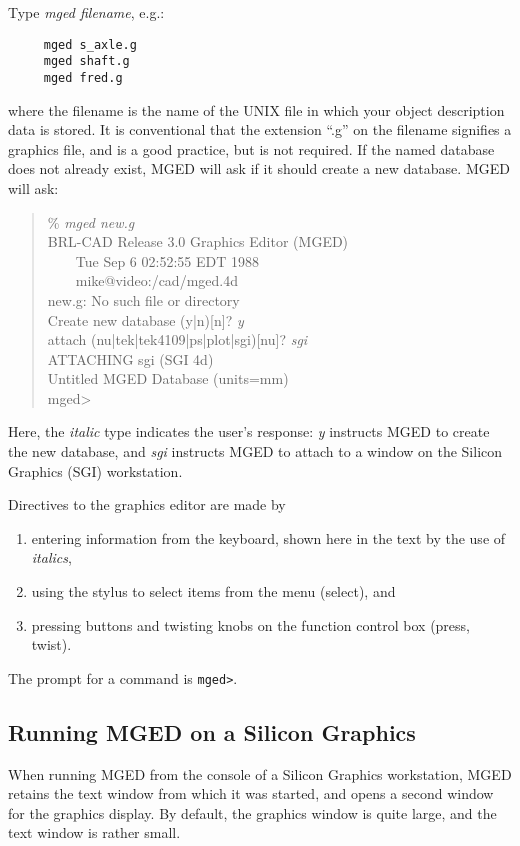 Type {\em mged filename}, e.g.:
\begin{verbatim}
     mged s_axle.g
     mged shaft.g
     mged fred.g
\end{verbatim}
where the filename is the name of the UNIX file in which
your object description data is stored.
It is conventional that the
extension ``.g'' on the filename
signifies a graphics file, and is a good practice, but is not required.
If the named database does not already exist,
MGED will ask if it should create a new database.
MGED will ask:

{\tt \begin{verse}
\% {\em mged new.g} \\
BRL-CAD Release 3.0 Graphics Editor (MGED) \\
\ \ \ \ Tue Sep 6 02:52:55 EDT 1988 \\
\ \ \ \ mike@video:/cad/mged.4d \\
new.g: No such file or directory \\
Create new database (y|n)[n]? {\em y} \\
attach (nu|tek|tek4109|ps|plot|sgi)[nu]? {\em sgi} \\
ATTACHING sgi (SGI 4d) \\
Untitled MGED Database (units=mm) \\
mged>
\end{verse} }
Here, the {\em italic} type indicates the user's response:
{\em y} instructs MGED to create the new database, and
{\em sgi} instructs MGED to attach to a window
on the Silicon Graphics (SGI) workstation.

Directives to the graphics editor are made by
\begin{enumerate}
\item entering information from the keyboard,
shown here in the text by the use of {\em italics},
\item using the stylus to select items from
the menu (select), and
\item pressing buttons and twisting knobs on the
function control box (press, twist).
\end{enumerate}

The prompt for a command is {\tt mged>}.

\subsection{Running MGED on a Silicon Graphics}

When running MGED from the console of a Silicon Graphics workstation,
MGED retains the text window from which it was started,
and opens a second window for the graphics display.
By default, the graphics window is quite large, and the text window
is rather small.

